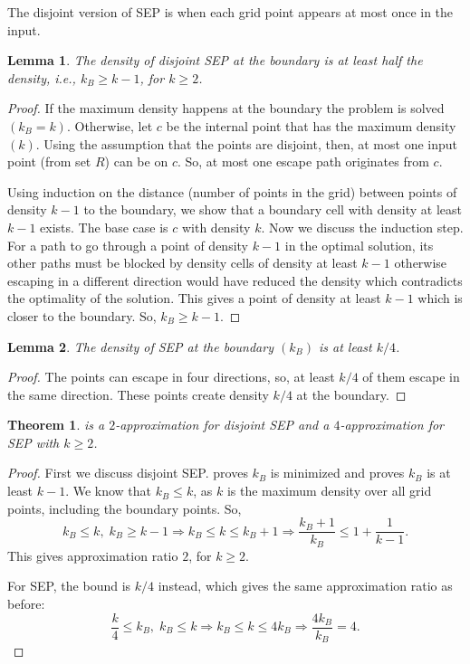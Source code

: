\documentclass[preprint,12pt]{elsarticle}
\newtheorem{theorem}{Theorem}
\newtheorem{lemma}{Lemma}
\begin{document}
The disjoint version of SEP is when each grid point appears at most once in the input.
\begin{lemma}\label{lemma:approx}
The density of disjoint SEP at the boundary is at least half the density, i.e., $k_B\geq k-1$, for $k\geq 2$.
\end{lemma}
\begin{proof}
If the maximum density happens at the boundary the problem is solved $(k_B=k)$. Otherwise, let $c$ be the internal point that has the maximum density $(k)$. Using the assumption that the points are disjoint, then, at most one input point (from set $R$) can be on $c$. So, at most one escape path originates from $c$.

Using induction on the distance (number of points in the grid) between points of density $k-1$ to the boundary, we show that a boundary cell with density at least $k-1$ exists. The base case is $c$ with density $k$. Now we discuss the induction step.
For a path to go through a point of density $k-1$ in the optimal solution, its other paths must be blocked by density cells of density at least $k-1$ otherwise escaping in a different direction would have reduced the density which contradicts the optimality of the solution. This gives a point of density at least $k-1$ which is closer to the boundary. So, $k_B \geq k-1$.
\end{proof}

\begin{lemma}\label{lemma:approx2}
The density of SEP at the boundary $(k_B)$ is at least $k/4$.
\end{lemma}
\begin{proof}
The points can escape in four directions, so, at least $k/4$ of them escape in the same direction. These points create density $k/4$ at the boundary.
\end{proof}

\begin{theorem}
 is a $2$-approximation for disjoint SEP and a $4$-approximation for SEP with $k\geq 2$.
\end{theorem}
\begin{proof}
First we discuss disjoint SEP.
 proves $k_B$ is minimized and  proves $k_B$ is at least $k-1$. We know that $k_B\leq k$, as $k$ is the maximum density over all grid points, including the boundary points. So,
\[
k_B \leq k, \; k_B\geq k-1 \Rightarrow k_B \leq k \leq k_B+1\Rightarrow \frac{k_B+1}{k_B}\leq 1+\frac{1}{k-1}.
\]
This gives approximation ratio $2$, for $k\geq 2$.

For SEP, the bound is $k/4$ instead, which gives the same approximation ratio as before:
\[
\frac{k}{4} \leq k_B,\; k_B \leq k \Rightarrow k_B \leq k \leq 4 k_B \Rightarrow \frac{4k_B}{k_B}=4.
\]
\end{proof}
\end{document}
